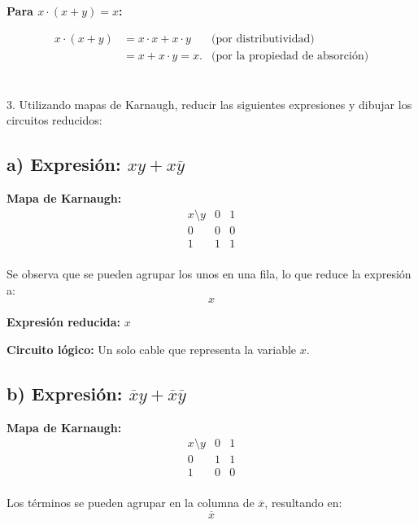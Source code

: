 \documentclass[11pt,letterpaper]{article}
\begin{document}
\textbf{Para \( x \cdot (x + y) = x \):}

\[
\begin{aligned}
x \cdot (x + y) &= x \cdot x + x \cdot y & \text{(por distributividad)} \\
                &= x + x \cdot y = x. & \text{(por la propiedad de absorción)}
\end{aligned}
\]







\section{}3. Utilizando mapas de Karnaugh, reducir las siguientes expresiones y dibujar los
circuitos reducidos:

\subsection*{a) Expresión: \( xy + x\overline{y} \)}

\textbf{Mapa de Karnaugh:}
\[
\begin{array}{c|cc}
x \setminus y & 0 & 1 \\
\hline
0 & 0 & 0 \\
1 & 1 & 1 \\
\end{array}
\]

Se observa que se pueden agrupar los unos en una fila, lo que reduce la expresión a:
\[
x
\]

\textbf{Expresión reducida:} \( x \)

\textbf{Circuito lógico:} Un solo cable que representa la variable \( x \).

\subsection*{b) Expresión: \( \overline{x}y + \overline{x}\overline{y} \)}

\textbf{Mapa de Karnaugh:}
\[
\begin{array}{c|cc}
x \setminus y & 0 & 1 \\
\hline
0 & 1 & 1 \\
1 & 0 & 0 \\
\end{array}
\]

Los términos se pueden agrupar en la columna de \( \overline{x} \), resultando en:
\[
\overline{x}
\]
\end{document}
